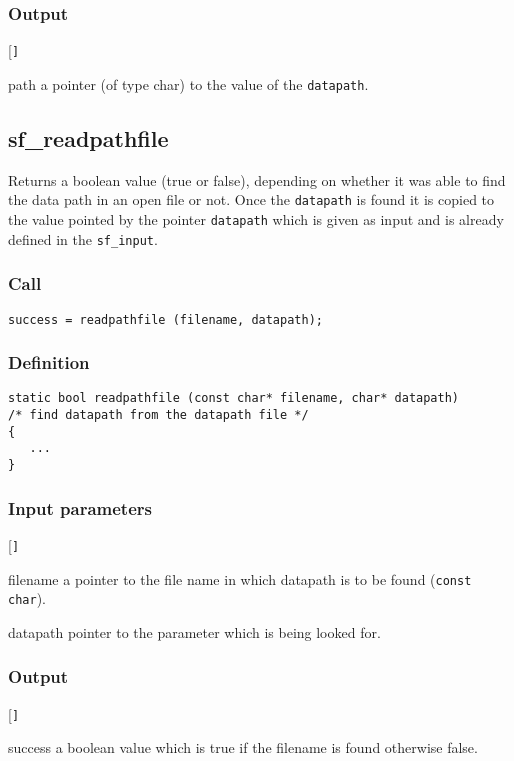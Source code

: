 \subsubsection*{Output}
\begin{desclist}{\tt }{\quad}[\tt ]
   \setlength\itemsep{0pt}
   \item[path] a pointer (of type char) to the value of the \texttt{datapath}.
\end{desclist}




\subsection{{sf\_readpathfile}}
Returns a boolean value (true or false), depending on whether it was able to find the data path in an open file or not. Once the \texttt{datapath} is found it is copied to the value pointed by the pointer \texttt{datapath} which is given as input and is already defined in the \texttt{sf\_input}. 

\subsubsection*{Call}
\begin{verbatim}success = readpathfile (filename, datapath);\end{verbatim}

\subsubsection*{Definition}
\begin{verbatim}
static bool readpathfile (const char* filename, char* datapath) 
/* find datapath from the datapath file */
{
   ...
}
\end{verbatim}

\subsubsection*{Input parameters}
\begin{desclist}{\tt }{\quad}[\tt ]
   \setlength\itemsep{0pt}
   \item[filename] a pointer to the file name in which datapath is to be found (\texttt{const char}). 
   \item[datapath] pointer to the parameter which is being looked for.
\end{desclist}

\subsubsection*{Output}
\begin{desclist}{\tt }{\quad}[\tt ]
   \setlength\itemsep{0pt}
   \item[success] a boolean value which is true if the filename is found otherwise false.
\end{desclist}




